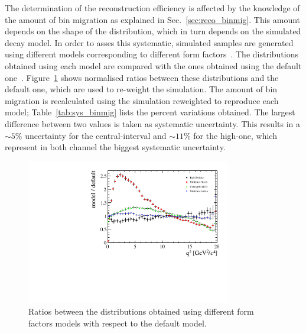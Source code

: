 The determination of the reconstruction efficiency is affected by the knowledge of the
amount of bin migration as explained in Sec.~\ref{sec:reco_binmig}. This amount depends
on the shape of the \qsq distribution, which in turn depends on the simulated \BdToKstee decay model.
In order to asses this systematic, simulated samples are generated using different
models corresponding to different form factors~\cite{Ball:2004ye,Melikhov:2000yu}.
The \qsq distributions obtained using each model are compared with the ones obtained using
the default one~\cite{Ali:1999mm}.
Figure~\ref{fig:q2ratios} shows normalised ratios between these \qsq distributions and the default one, 
which are used to re-weight the simulation. The amount of bin migration is recalculated
using the simulation reweighted to reproduce each model; Table~\ref{tab:sys_binmig} lists the
percent variations obtained. The largest difference between two values is taken as systematic uncertainty.
This results in a $\sim5\%$ uncertainty for the central-\qsq interval and $\sim11\%$ for the high-\qsq one,
which represent in both channel the biggest systematic uncertainty.
%
\begin{figure}[h!]
\centering \includegraphics[width=0.8\textwidth]{RKst/figs/models_ratios.pdf}
\caption{Ratios between the \qsq distributions obtained using different form
factors models with respect to the default model. }
\label{fig:q2ratios}
\end{figure}
%
\begin{table}[h!]
\centering
\caption{Percent variation on the bin migration amount obtained using different form factors models.}
\label{tab:sys_binmig}
\end{table}




